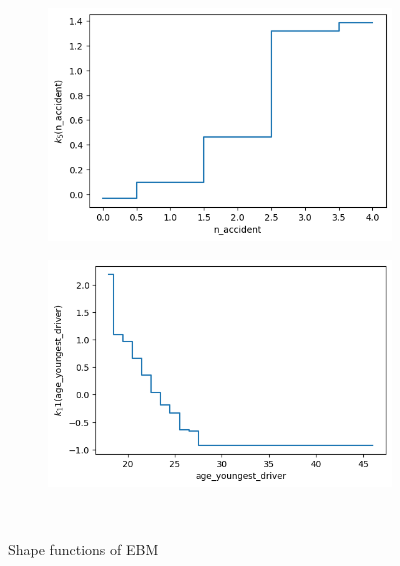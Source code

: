 \documentclass[12pt,titlepage]{article}
\begin{document}
\begin{figure}
\begin{subfigure}{.55\textwidth}
            \includegraphics[width=1\linewidth]{shape_function_n_accident.png}
        \end{subfigure}%
        \begin{subfigure}{.55\textwidth}
            \centering
            \includegraphics[width=1\linewidth]{shape_function_age_youngest_driver.png}
        \end{subfigure} \\
    \caption{Shape functions of EBM}
    \label{fig:shapefct}
\end{figure}
\end{document}
